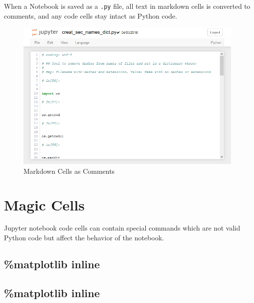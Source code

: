 \documentclass{book}
\makeatletter
\def\maxwidth{\ifdim\Gin@nat@width>\linewidth\linewidth
    \else\Gin@nat@width\fi}
\let\Oldincludegraphics\includegraphics
\renewcommand{\includegraphics}[1]{\Oldincludegraphics[width=.8\maxwidth]{#1}}
\makeatother
\begin{document}
When a Notebook is saved as a \lstinline!.py! file, all text in markdown
cells is converted to comments, and any code cells stay intact as Python
code.

\begin{figure}
\centering
\includegraphics{images/jupyter_notebook_markdown_cells_as_comments.png}
\caption{Markdown Cells as Comments}
\end{figure}
    




    
        \section{Magic Cells}\label{magic-cells}
    




    
        Jupyter notebook code cells can contain special commands which are not
valid Python code but affect the behavior of the notebook.
    




    
        \subsection{\%matplotlib inline}\label{matplotlib-inline}
    




    
        \subsection{\%matplotlib inline}\label{matplotlib-inline}
\end{document}
